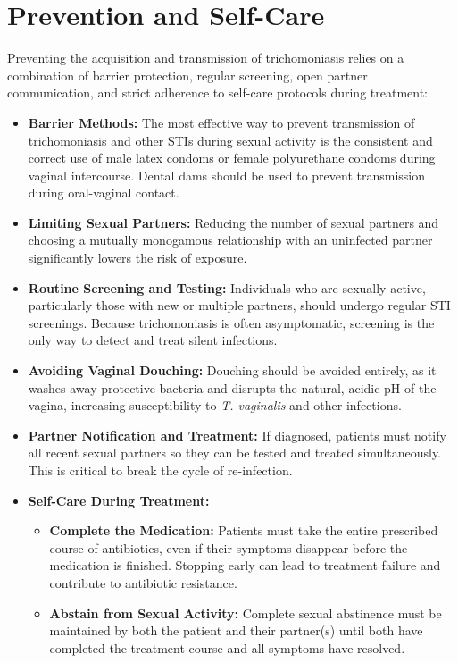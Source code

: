 \section*{Prevention and Self-Care}
Preventing the acquisition and transmission of trichomoniasis relies on a combination of barrier protection, regular screening, open partner communication, and strict adherence to self-care protocols during treatment:
\begin{itemize}
    \item \textbf{Barrier Methods:} The most effective way to prevent transmission of trichomoniasis and other STIs during sexual activity is the consistent and correct use of male latex condoms or female polyurethane condoms during vaginal intercourse. Dental dams should be used to prevent transmission during oral-vaginal contact.
    \item \textbf{Limiting Sexual Partners:} Reducing the number of sexual partners and choosing a mutually monogamous relationship with an uninfected partner significantly lowers the risk of exposure.
    \item \textbf{Routine Screening and Testing:} Individuals who are sexually active, particularly those with new or multiple partners, should undergo regular STI screenings. Because trichomoniasis is often asymptomatic, screening is the only way to detect and treat silent infections.
    \item \textbf{Avoiding Vaginal Douching:} Douching should be avoided entirely, as it washes away protective bacteria and disrupts the natural, acidic pH of the vagina, increasing susceptibility to \textit{T. vaginalis} and other infections.
    \item \textbf{Partner Notification and Treatment:} If diagnosed, patients must notify all recent sexual partners so they can be tested and treated simultaneously. This is critical to break the cycle of re-infection.
    \item \textbf{Self-Care During Treatment:}
    \begin{itemize}
        \item \textbf{Complete the Medication:} Patients must take the entire prescribed course of antibiotics, even if their symptoms disappear before the medication is finished. Stopping early can lead to treatment failure and contribute to antibiotic resistance.
        \item \textbf{Abstain from Sexual Activity:} Complete sexual abstinence must be maintained by both the patient and their partner(s) until both have completed the treatment course and all symptoms have resolved.

\end{itemize}
\end{itemize}
